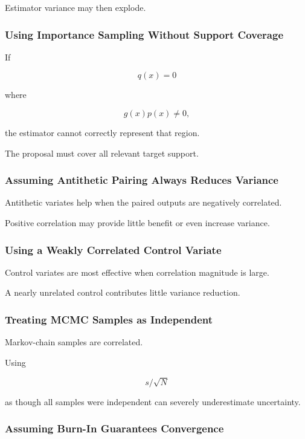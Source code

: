Estimator variance may then explode.

\subsubsection{Using Importance Sampling Without Support Coverage}

If

\[
q(x)=0
\]

where

\[
g(x)p(x)\neq0,
\]

the estimator cannot correctly represent that region.

The proposal must cover all relevant target support.

\subsubsection{Assuming Antithetic Pairing Always Reduces Variance}

Antithetic variates help when the paired outputs are negatively
correlated.

Positive correlation may provide little benefit or even increase
variance.

\subsubsection{Using a Weakly Correlated Control Variate}

Control variates are most effective when correlation magnitude is large.

A nearly unrelated control contributes little variance reduction.

\subsubsection{Treating MCMC Samples as Independent}

Markov-chain samples are correlated.

Using

\[
s/\sqrt{N}
\]

as though all samples were independent can severely underestimate
uncertainty.

\subsubsection{Assuming Burn-In Guarantees Convergence}

